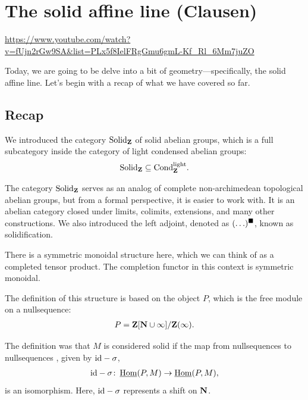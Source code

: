 
\section{\ufs The solid affine line (Clausen)}

\url{https://www.youtube.com/watch?v=fUjn2rGw9SA&list=PLx5f8IelFRgGmu6gmL-Kf_Rl_6Mm7juZO}
\renewcommand{\yt}[2]{\href{https://www.youtube.com/watch?v=fUjn2rGw9SA&list=PLx5f8IelFRgGmu6gmL-Kf_Rl_6Mm7juZO&t=#1}{#2}}
\vspace{1em}

Today, we are going to be delve into a bit of geometry---specifically, the solid affine line. Let's begin with a recap of what we have covered so far.

\subsection{Recap}

We introduced the category $\mathrm{Solid}_\mathbf Z$ of solid abelian groups, which is a full subcategory inside the category of light condensed abelian groups:
\begin{align*}
\mathrm{Solid}_\mathbf Z \subseteq \mathrm{Cond}_\mathbf Z^{\mathrm{light}}.
\end{align*}

The category $\mathrm{Solid}_\mathbf Z$ serves as an analog of complete non-archimedean topological abelian groups, but from a formal perspective, it is easier to work with. It is an abelian category closed under limits, colimits, extensions, and many other constructions.
We also introduced the left adjoint, denoted as $(\ldots)^\blacksquare$, known as solidification. 


There is a symmetric monoidal structure here, which we can think of as a completed tensor product. The completion functor in this context is symmetric monoidal.

The definition of this structure is based on the object $P$, which is the free module on a nullsequence:
\begin{align*}
P = \mathbf Z[\mathbf N \cup \infty] / \mathbf Z(\infty).
\end{align*}

The definition was that $M$ is considered solid if the map from nullsequences to nullsequences , given by $\mathrm{id} - \sigma$, 
\begin{align*}
\mathrm{id} - \sigma \colon \operatorname{\underline{Hom}}(P,M) \to \operatorname{\underline{Hom}}(P,M),
\end{align*}
is an isomorphism. Here, $\mathrm{id} - \sigma$ represents a shift on $\mathbf N$.


